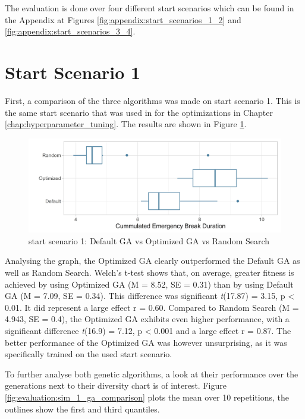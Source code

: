 The evaluation is done over four different start scenarios which can be found in the Appendix at Figures \ref{fig:appendix:start_scenarios_1_2} and \ref{fig:appendix:start_scenarios_3_4}.

\section{Start Scenario 1}
First, a comparison of the three algorithms was made on start scenario 1. This is the same start scenario that was used in for the optimizations in Chapter \ref{chap:hyperparameter_tuning}. The results are shown in Figure \ref{fig:evaluation:sim_1_comparison}.

\begin{figure}[ht] 
	\includegraphics[width=1\linewidth]{simulations/evaluation/plots/sim_1_comparison}
	\caption{start scenario 1: Default GA vs Optimized GA vs Random Search}
	\label{fig:evaluation:sim_1_comparison}
\end{figure}

Analysing the graph, the Optimized GA clearly outperformed the Default GA as well as Random Search. Welch's t-test shows that, on average, greater fitness is achieved by using Optimized GA (M = 8.52, SE = 0.31) than by using Default GA (M = 7.09, SE = 0.34). This difference was significant \textit{t}(17.87) = 3.15, p < 0.01. It did represent a large effect r = 0.60. Compared to Random Search (M = 4.943, SE = 0.4), the Optimized GA exhibits even higher performance, with a significant difference \textit{t}(16.9) = 7.12, p < 0.001 and a large effect r = 0.87. The better performance of the Optimized GA was however unsurprising, as it was specifically trained on the used start scenario.

To further analyse both genetic algorithms, a look at their performance over the generations next to their diversity chart is of interest. Figure \ref{fig:evaluation:sim_1_ga_comparison} plots the mean over 10 repetitions, the outlines show the first and third quantiles.


